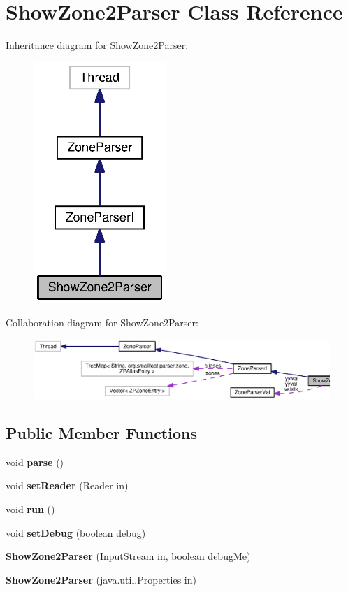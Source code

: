 \section{Show\+Zone2\+Parser Class Reference}
\label{classorg_1_1smallfoot_1_1parser_1_1zone_1_1ShowZone2Parser}


Inheritance diagram for Show\+Zone2\+Parser\+:\nopagebreak
\begin{figure}[H]
\begin{center}
\leavevmode
\includegraphics[width=142pt]{classorg_1_1smallfoot_1_1parser_1_1zone_1_1ShowZone2Parser__inherit__graph}
\end{center}
\end{figure}


Collaboration diagram for Show\+Zone2\+Parser\+:\nopagebreak
\begin{figure}[H]
\begin{center}
\leavevmode
\includegraphics[width=350pt]{classorg_1_1smallfoot_1_1parser_1_1zone_1_1ShowZone2Parser__coll__graph}
\end{center}
\end{figure}
\subsection*{Public Member Functions}
\begin{DoxyCompactItemize}
\item 
void {\bf parse} ()
\item 
void {\bf set\+Reader} (Reader in)
\item 
void {\bf run} ()
\item 
void {\bf set\+Debug} (boolean debug)
\item 
{\bf Show\+Zone2\+Parser} (Input\+Stream in, boolean debug\+Me)
\item 
{\bf Show\+Zone2\+Parser} (java.\+util.\+Properties in)
\end{DoxyCompactItemize}
